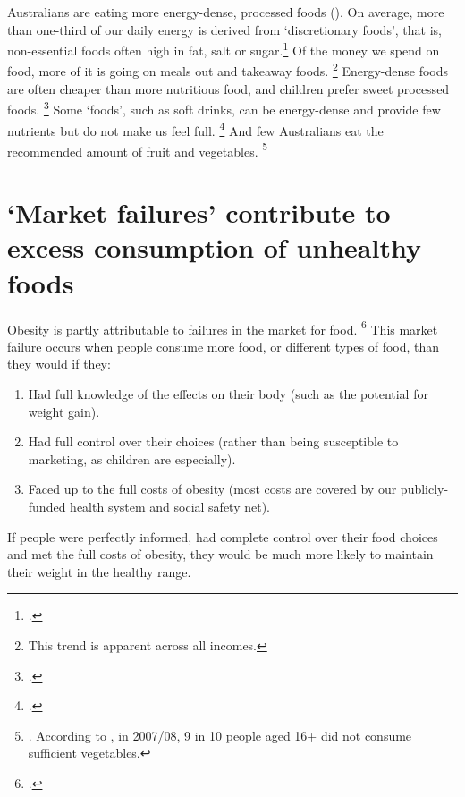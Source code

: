 \documentclass[embargoed]{grattan}
\begin{document}
Australians are eating more energy-dense, processed foods ().
On average, more than one-third of our daily energy is derived from `discretionary foods', that is, non-essential foods often high in fat, salt or sugar.\footcites{ABS20144364055007AustralianHealth}{Hendrie2016CSIROHealthyDiet} Of the money we spend on food, more of it is going on meals out and takeaway foods.%
\footnote{This trend is apparent across all incomes.} Energy-dense foods are often cheaper than more nutritious food, and children prefer sweet processed foods.%
\footcite{Roberto2015Patchyprogressobesity} Some `foods', such as soft drinks, can be energy-dense and provide few nutrients but do not make us feel full.%
\footcites{Mozaffarian2016politicssciencesoda}{Fletcher2011Aresoftdrink}{Malik2006Intakesugarsweetened}{Ruyter2012trialsugarfree}{Johnson2009Dietarysugarsintake} And few Australians eat the recommended amount of fruit and vegetables.%
\footnote{\textcite{Hendrie2016CSIROHealthyDiet}.
According to \textcite{Health2012Australiasfood}, in 2007/08, 9 in 10 people aged 16+ did not consume sufficient vegetables.} 

\clearpage
\section{`Market failures’ contribute to excess consumption of unhealthy foods }\label{many-of-the-factors-contributing-to-excess-energy-in-are-market-failures}

Obesity is partly attributable to failures in the market for food.%
\footcite{Karnani2016ObesityCrisisas} This market failure occurs when people consume more food, or different types of food, than they would if they:

\begin{enumerate}
 \item Had full knowledge of the effects on their body (such as the potential for weight gain). 
 \item Had full control over their choices (rather than being susceptible to marketing, as children are especially). 
 \item Faced up to the full costs of obesity (most costs are covered by our publicly-funded health system and social safety net).
\end{enumerate}

If people were perfectly informed, had complete control over their food choices and met the full costs of obesity, they would be much more likely to maintain their weight in the healthy range.
\end{document}
